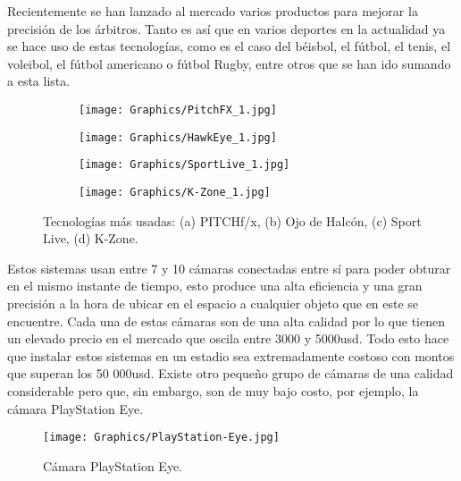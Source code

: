 Recientemente se han lanzado al mercado varios productos para mejorar la
precisión de los árbitros. Tanto es así que en varios deportes en la actualidad ya
se hace uso de estas tecnologías, como es el caso del béisbol, el fútbol, el tenis,
el voleibol, el fútbol americano o fútbol Rugby, entre otros que se han ido sumando
a esta lista.

\begin{figure}[H]
	\centering
	\begin{subfigure}[b]{0.49\linewidth}
		\texttt{[image: Graphics/PitchFX\_1.jpg]}
		\caption{}
	\end{subfigure}
	\begin{subfigure}[b]{0.49\linewidth}
		\texttt{[image: Graphics/HawkEye\_1.jpg]}
		\caption{}
	\end{subfigure}
    \begin{subfigure}[b]{0.49\linewidth}
        \texttt{[image: Graphics/SportLive\_1.jpg]}
        \caption{}
    \end{subfigure}
    \begin{subfigure}[b]{0.49\linewidth}
        \texttt{[image: Graphics/K-Zone\_1.jpg]}
        \caption{}
    \end{subfigure}
    \caption{Tecnologías más usadas: (a) PITCHf/x, (b) Ojo de Halcón, (c) Sport Live, (d) K-Zone.}
	\label{fig:technologys}
\end{figure}

Estos sistemas usan entre 7 y 10 cámaras conectadas entre sí para poder obturar
en el mismo instante de tiempo, esto produce una alta eficiencia y una gran
precisión a la hora de ubicar en el espacio a cualquier objeto que en este se
encuentre. Cada una de estas cámaras son de una alta calidad por lo que tienen
un elevado precio en el mercado que oscila entre 3000 y 5000usd. Todo esto hace
que instalar estos sistemas en un estadio sea extremadamente costoso con
montos que superan los 50 000usd. Existe otro pequeño grupo de cámaras de
una calidad considerable pero que, sin embargo, son de muy bajo costo, por
ejemplo, la cámara PlayStation Eye.

\begin{figure}[H]
    \centering
    \texttt{[image: Graphics/PlayStation-Eye.jpg]}
    \caption{Cámara PlayStation Eye.}
\end{figure}

